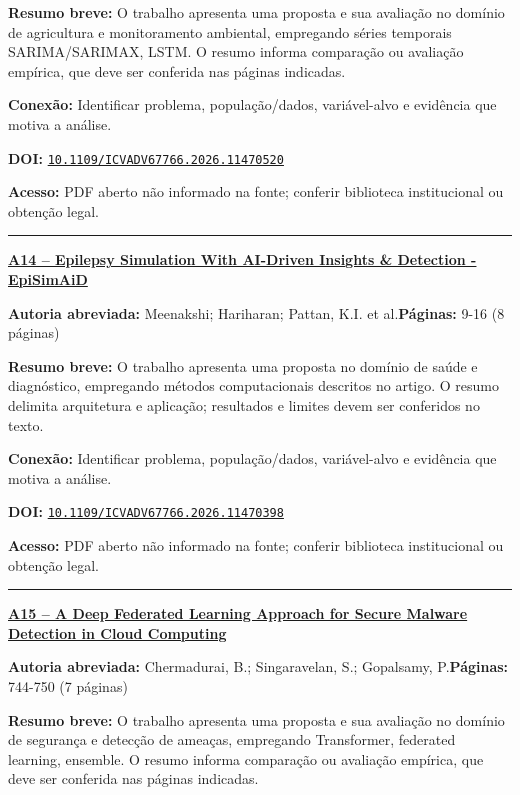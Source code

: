 \documentclass[10pt,a4paper]{article}
\begin{document}
\textbf{Resumo breve:} O trabalho apresenta uma proposta e sua avaliação no domínio de agricultura e monitoramento ambiental, empregando séries temporais SARIMA/SARIMAX, LSTM. O resumo informa comparação ou avaliação empírica, que deve ser conferida nas páginas indicadas.\par
\textbf{Conexão:} Identificar problema, população/dados, variável-alvo e evidência que motiva a análise.\par
\textbf{DOI:} \href{https://doi.org/10.1109/ICVADV67766.2026.11470520}{\nolinkurl{10.1109/ICVADV67766.2026.11470520}}\par
\textbf{Acesso:} PDF aberto não informado na fonte; conferir biblioteca institucional ou obtenção legal.\par
\noindent\rule{\textwidth}{0.35pt}
\par\medskip\noindent
{\large\bfseries\href{https://doi.org/10.1109/ICVADV67766.2026.11470398}{A14 -- Epilepsy Simulation With AI-Driven Insights \& Detection - EpiSimAiD}}\par\smallskip
\textbf{Autoria abreviada:} Meenakshi; Hariharan; Pattan, K.I. et al.\quad \textbf{Páginas:} 9-16 (8 páginas)\par
\textbf{Resumo breve:} O trabalho apresenta uma proposta no domínio de saúde e diagnóstico, empregando métodos computacionais descritos no artigo. O resumo delimita arquitetura e aplicação; resultados e limites devem ser conferidos no texto.\par
\textbf{Conexão:} Identificar problema, população/dados, variável-alvo e evidência que motiva a análise.\par
\textbf{DOI:} \href{https://doi.org/10.1109/ICVADV67766.2026.11470398}{\nolinkurl{10.1109/ICVADV67766.2026.11470398}}\par
\textbf{Acesso:} PDF aberto não informado na fonte; conferir biblioteca institucional ou obtenção legal.\par
\noindent\rule{\textwidth}{0.35pt}
\par\medskip\noindent
{\large\bfseries\href{https://doi.org/10.1109/ICVADV67766.2026.11470497}{A15 -- A Deep Federated Learning Approach for Secure Malware Detection in Cloud Computing}}\par\smallskip
\textbf{Autoria abreviada:} Chermadurai, B.; Singaravelan, S.; Gopalsamy, P.\quad \textbf{Páginas:} 744-750 (7 páginas)\par
\textbf{Resumo breve:} O trabalho apresenta uma proposta e sua avaliação no domínio de segurança e detecção de ameaças, empregando Transformer, federated learning, ensemble. O resumo informa comparação ou avaliação empírica, que deve ser conferida nas páginas indicadas.\par
\end{document}
